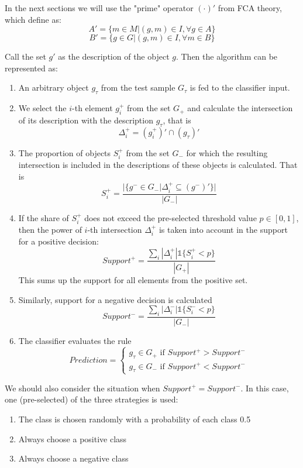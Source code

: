 \documentclass{article}
\begin{document}
In the next sections we will use the "prime" operator $({\cdot})'$ from FCA theory, which define as:
$$A' = \{ m \in M | (g,m) \in I, \forall g \in A \}$$
$$B' = \{ g \in G | (g,m) \in I, \forall m \in B \}$$

Call the set $g'$ as the description of the object $g$. Then the algorithm can be represented as:

\begin{enumerate}
    \item An arbitrary object $g_\tau$ from the test sample $G_\tau$ is fed to the classifier input.
    \item We select the $i$-th element $g_i^+$ from the set $G_+$ and calculate the intersection of its description with the description $g_\tau$, that is
    $$ \Delta_i^+ = (g_i^+)' \cap (g_\tau)'$$
    \item The proportion of objects $S_i^+$ from the set $G_-$ for which the resulting intersection is included in the descriptions of these objects is calculated. That is
    \begin{equation}\label{eq:1}
        S_i^+ = \frac{|\{g^-\in G_-|\Delta_i^+ \subseteq (g^- )'\}|}{|G_-|}    
    \end{equation}
    \item If the share of $S_i^+$ does not exceed the pre-selected threshold value $p \in [0, 1]$, then the power of $i$-th intersection $\Delta_i^+$ is taken into account in the support for a positive decision:
    \begin{equation}\label{eq:2}
        Support^+ = \frac{\sum_i |\Delta_i^+| \mathbb{1} \{S_i^+<p\}}{|G_+|}    
    \end{equation}
    This sums up the support for all elements from the positive set.
    \item Similarly, support for a negative decision is calculated
    \begin{equation}\label{eq:3}
        Support^- = \frac{\sum_i |\Delta_i^-| \mathbb{1} \{S_i^-<p\}}{|G_-|}    
    \end{equation}
    \item The classifier evaluates the rule
    $$Prediction = \begin{cases}
    g_\tau \in G_+ \text{ if } Support^+ > Support^-\\
    g_\tau \in G_- \text{ if } Support^+ < Support^-
    \end{cases}$$
\end{enumerate}
We should also consider the situation when $Support^+ = Support^-$. In this case, one (pre-selected) of the three strategies is used:
\begin{enumerate}
    \item The class is chosen randomly with a probability of each class 0.5
    \item Always choose a positive class
    \item Always choose a negative class
\end{enumerate}
\end{document}
